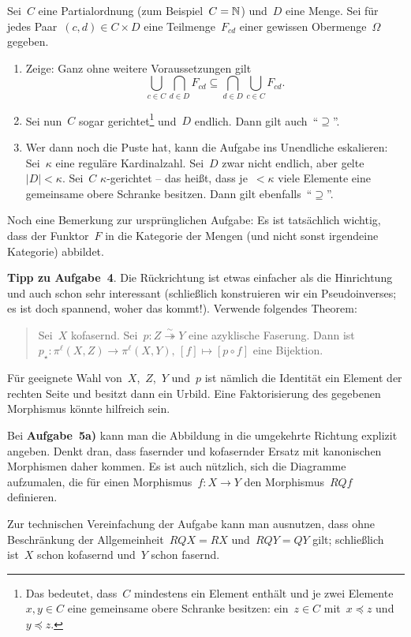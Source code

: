 \documentclass{uebblatt}
\begin{document}
Sei~$C$ eine Partialordnung (zum Beispiel~$C = \mathbb{N}$) und~$D$ eine Menge.
Sei für jedes Paar~$(c,d) \in C \times D$ eine Teilmenge~$F_{cd}$ einer
gewissen Obermenge~$\Omega$ gegeben.
\begin{enumerate}
\item Zeige: Ganz ohne weitere Voraussetzungen gilt
\[ \bigcup_{c \in C} \bigcap_{d \in D} F_{cd} \subseteq \bigcap_{d \in D} \bigcup_{c \in C} F_{cd}.
\]
\item Sei nun~$C$ sogar gerichtet\footnote{Das bedeutet, dass~$C$ mindestens
ein Element enthält und je zwei Elemente~$x,y \in C$ eine gemeinsame obere
Schranke besitzen: ein~$z \in C$ mit~$x \preceq z$ und~$y \preceq z$.} und~$D$
endlich. Dann gilt auch~"`$\supseteq$"'.
\item Wer dann noch die Puste hat, kann die Aufgabe ins Unendliche eskalieren:
Sei~$\kappa$ eine reguläre Kardinalzahl. Sei~$D$ zwar nicht endlich, aber
gelte~$|D| < \kappa$. Sei~$C$ $\kappa$-gerichtet -- das heißt, dass je~$<
\kappa$ viele Elemente eine gemeinsame obere Schranke besitzen. Dann gilt
ebenfalls~"`$\supseteq$"'.
\end{enumerate}

Noch eine Bemerkung zur ursprünglichen Aufgabe: Es ist tatsächlich wichtig,
dass der Funktor~$F$ in die Kategorie der Mengen (und nicht sonst irgendeine
Kategorie) abbildet.

\textbf{Tipp zu Aufgabe~4}. Die Rückrichtung ist etwas einfacher als die
Hinrichtung und auch schon sehr interessant (schließlich konstruieren wir ein
Pseudoinverses; es ist doch spannend, woher das kommt!). Verwende folgendes
Theorem:
\begin{quote}Sei~$X$ kofasernd. Sei~$p : Z \stackrel{\sim}{\twoheadrightarrow} Y$
eine azyklische Faserung. Dann ist~$p_\star : \pi^\ell(X,Z) \to
\pi^\ell(X,Y),\,[f] \mapsto [p \circ f]$ eine Bijektion.
\end{quote}
Für geeignete Wahl von~$X$,~$Z$,~$Y$ und~$p$ ist nämlich die Identität ein
Element der rechten Seite und besitzt dann ein Urbild. Eine Faktorisierung des
gegebenen Morphismus könnte hilfreich sein.

Bei \textbf{Aufgabe~5a)} kann man die Abbildung in die umgekehrte Richtung
explizit angeben. Denkt dran, dass fasernder und kofasernder Ersatz mit
kanonischen Morphismen daher kommen. Es ist auch nützlich, sich die Diagramme
aufzumalen, die für einen Morphismus~$f : X \to Y$ den Morphismus~$RQf$
definieren.

Zur technischen Vereinfachung der Aufgabe kann man ausnutzen, dass ohne
Beschränkung der Allgemeinheit~$RQX = RX$ und~$RQY = QY$ gilt; schließlich ist~$X$
schon kofasernd und~$Y$ schon fasernd.
\end{document}
